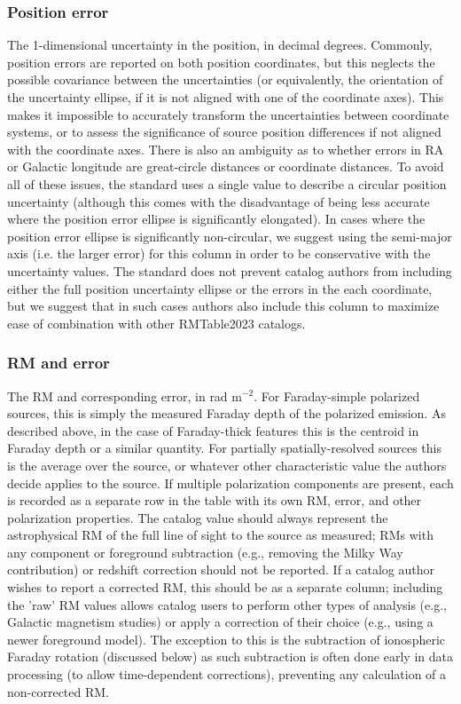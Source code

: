 \documentclass[10pt,modern]{aastex63}
\newcommand{\radu}{rad m$^{-2}$}
\begin{document}
\subsubsection{Position error}
The 1-dimensional uncertainty in the position, in decimal degrees. Commonly, position errors are reported on both position coordinates, but this neglects the possible covariance between the uncertainties (or equivalently, the orientation of the uncertainty ellipse, if it is not aligned with one of the coordinate axes). This makes it impossible to accurately transform the uncertainties between coordinate systems, or to assess the significance of source position differences if not aligned with the coordinate axes. There is also an ambiguity as to whether errors in RA or Galactic longitude are great-circle distances or coordinate distances. To avoid all of these issues, the standard uses a single value to describe a circular position uncertainty (although this comes with the disadvantage of being less accurate where the position error ellipse is significantly elongated). In cases where the position error ellipse is significantly non-circular, we suggest using the semi-major axis (i.e. the larger error) for this column in order to be conservative with the uncertainty values. The standard does not prevent catalog authors from including either the full position uncertainty ellipse or the errors in the each coordinate, but we suggest that in such cases authors also include this column to maximize ease of combination with other RMTable2023 catalogs.

\subsubsection{RM and error}
The RM and corresponding error, in \radu. For Faraday-simple polarized sources, this is simply the measured Faraday depth of the polarized emission. As described above, in the case of Faraday-thick features this is the centroid in Faraday depth or a similar quantity. For partially spatially-resolved sources this is the average over the source, or whatever other characteristic value the authors decide applies to the source. If multiple polarization components are present, each is recorded as a separate row in the table with its own RM, error, and other polarization properties. The catalog value should always represent the astrophysical RM of the full line of sight to the source as measured; RMs with any component or foreground subtraction (e.g., removing the Milky Way contribution) or redshift correction should not be reported. If a catalog author wishes to report a corrected RM, this should be as a separate column; including the 'raw' RM values allows catalog users to perform other types of analysis (e.g., Galactic magnetism studies) or apply a correction of their choice (e.g., using a newer foreground model). The exception to this is the subtraction of ionospheric Faraday rotation (discussed below) as such subtraction is often done early in data processing (to allow time-dependent corrections), preventing any calculation of a non-corrected RM.
\end{document}
